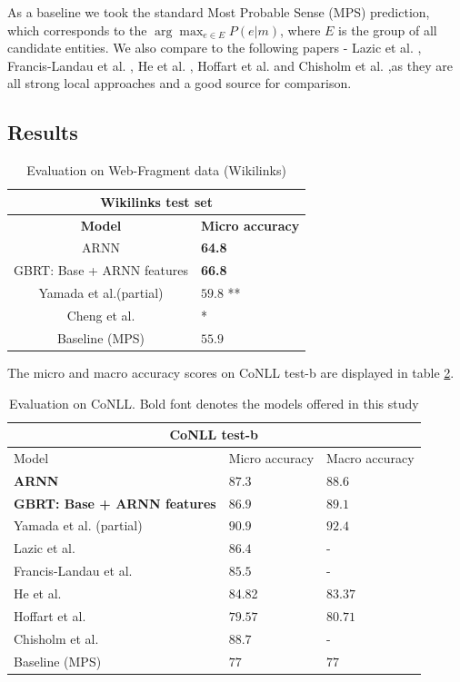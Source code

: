 \documentclass[11pt]{article}
\begin{document}
As a baseline we took the standard Most Probable Sense (MPS) prediction, which corresponds to the $\arg\max_{e\in{{E}}}{P(e|m)}$, where $E$ is the group of all candidate entities.
We also compare to the following papers - Lazic et al. , Francis-Landau et al. , He et al. , Hoffart et al.  and Chisholm et al.  ,as they are all strong local approaches and a good source for comparison.
	
\subsection{Results}

\begin{table}[h]
	\begin{center}
		\begin{tabular}{|c| p{1.5cm}|}
			\hline \multicolumn{2}{|c|}{Wikilinks test set} \\
			\hline \bf Model & \bf Micro     accuracy  \\ \hline
			ARNN  &  \bf64.8\\
			GBRT: Base + ARNN features & \bf 66.8 \\
			Yamada et al.(partial) & $59.8$ ** \\
			Cheng et al. & * \\ 
			Baseline (MPS) & $55.9$ \\
			\hline
		\end{tabular}
	\end{center}
	\caption{\label{tab:b} Evaluation on Web-Fragment data (Wikilinks)}
\end{table}

The micro and macro accuracy scores on CoNLL test-b are displayed in table \ref{tab:a}. 

	
\begin{table}[h]
	\begin{center}
		\begin{tabular}{|p{3.5cm}| p{1.5cm} p{1.5cm}|}
			\hline \multicolumn{3}{|c|}{CoNLL test-b} \\
			\hline Model & Micro     accuracy & Macro     accuracy \\ \hline
			\bf ARNN  & \bf $87.3$ & \bf $88.6$ \\
			\bf GBRT: Base + ARNN features & \bf $86.9$ & \bf $89.1$ \\
			Yamada et al. (partial) & $90.9$ & $92.4$ \\
			Lazic et al. & $86.4$ & - \\
			Francis-Landau et al. & $85.5$ & - \\
			He et al. & 84.82 & $83.37$ \\	
			Hoffart et al. & $79.57$ & $80.71$ \\
			Chisholm et al. & $88.7$ & - \\			
			Baseline (MPS) & $77$ & $77$ \\
			\hline
		\end{tabular}
	\end{center}
	\caption{\label{tab:a} Evaluation on CoNLL. Bold font denotes the models offered in this study}
\end{table}
\end{document}
